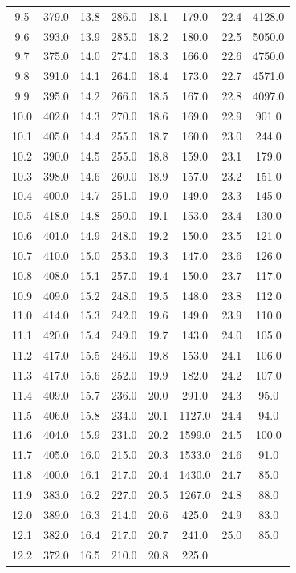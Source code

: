 \documentclass[titlepage = firstcover]{scrartcl}
\begin{document}
\begin{table}
\begin{tabular}{c c c c c c c c}
            9.5	 & 379.0 & 13.8 & 286.0 & 18.1 & 179.0 &  22.4 & 4128.0\\ 
            9.6	 & 393.0 & 13.9 & 285.0 & 18.2 & 180.0 &  22.5 & 5050.0\\ 
            9.7	 & 375.0 & 14.0 & 274.0 & 18.3 & 166.0 &  22.6 & 4750.0\\ 
            9.8	 & 391.0 & 14.1 & 264.0 & 18.4 & 173.0 &  22.7 & 4571.0\\ 
            9.9	 & 395.0 & 14.2 & 266.0 & 18.5 & 167.0 &  22.8 & 4097.0\\
            10.0 & 402.0 & 14.3 & 270.0 & 18.6 & 169.0 &  22.9 & 901.0\\ 
            10.1 & 405.0 & 14.4 & 255.0 & 18.7 & 160.0 &  23.0 & 244.0\\ 
            10.2 & 390.0 & 14.5 & 255.0 & 18.8 & 159.0 &  23.1 & 179.0\\ 
            10.3 & 398.0 & 14.6 & 260.0 & 18.9 & 157.0 &  23.2 & 151.0\\ 
            10.4 & 400.0 & 14.7 & 251.0 & 19.0 & 149.0 &  23.3 & 145.0\\ 
            10.5 & 418.0 & 14.8 & 250.0 & 19.1 & 153.0 &  23.4 & 130.0\\ 
            10.6 & 401.0 & 14.9 & 248.0 & 19.2 & 150.0 &  23.5 & 121.0\\ 
            10.7 & 410.0 & 15.0 & 253.0 & 19.3 & 147.0 &  23.6 & 126.0\\ 
            10.8 & 408.0 & 15.1 & 257.0 & 19.4 & 150.0 &  23.7 & 117.0\\ 
            10.9 & 409.0 & 15.2 & 248.0 & 19.5 & 148.0 &  23.8 & 112.0\\ 
            11.0 & 414.0 & 15.3 & 242.0 & 19.6 & 149.0 &  23.9 & 110.0\\ 
            11.1 & 420.0 & 15.4 & 249.0 & 19.7 & 143.0 &  24.0 & 105.0\\ 
            11.2 & 417.0 & 15.5 & 246.0 & 19.8 & 153.0 &  24.1 & 106.0\\ 
            11.3 & 417.0 & 15.6 & 252.0 & 19.9 & 182.0 &  24.2 & 107.0\\ 
            11.4 & 409.0 & 15.7 & 236.0 & 20.0 & 291.0 &  24.3 & 95.0 \\ 
            11.5 & 406.0 & 15.8 & 234.0 & 20.1 & 1127.0 & 24.4 & 94.0 \\ 
            11.6 & 404.0 & 15.9 & 231.0 & 20.2 & 1599.0 & 24.5 & 100.0\\ 
            11.7 & 405.0 & 16.0 & 215.0 & 20.3 & 1533.0 & 24.6 & 91.0 \\ 
            11.8 & 400.0 & 16.1 & 217.0 & 20.4 & 1430.0 & 24.7 & 85.0 \\ 
            11.9 & 383.0 & 16.2 & 227.0 & 20.5 & 1267.0 & 24.8 & 88.0 \\ 
            12.0 & 389.0 & 16.3 & 214.0 & 20.6 & 425.0 &  24.9 & 83.0 \\ 
            12.1 & 382.0 & 16.4 & 217.0 & 20.7 & 241.0 &  25.0 & 85.0 \\ 
            12.2 & 372.0 & 16.5 & 210.0 & 20.8 & 225.0\\ 
            \bottomrule
          \end{tabular}
        \end{table}
\end{document}
